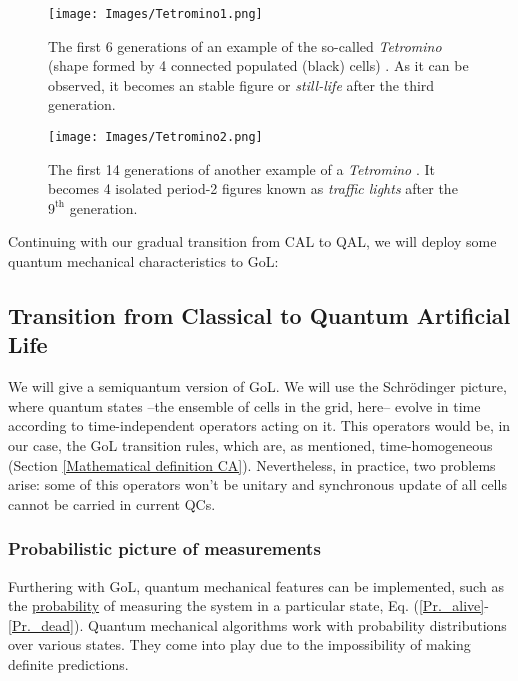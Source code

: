 \documentclass[11pt]{article}
\numberwithin{equation}{section} %
\numberwithin{figure}{section} %
\begin{document}
\begin{figure}[H] 
	\centering
	\texttt{[image: Images/Tetromino1.png]}
	\caption{The first 6 generations of an example of the so-called \emph{Tetromino} (shape formed by 4 connected populated (black) cells) \cite[p.~4, l.~9-10]{Gardner}. As it can be observed, it becomes an stable figure or \emph{still-life} after the third generation.}
	  \label{fig:Tetromino1}
\end{figure}

\begin{figure}[H] 
	\centering
	\texttt{[image: Images/Tetromino2.png]}
	\caption{The first 14 generations of another example of a \emph{Tetromino} \cite[p.~4, l.~10-11]{Gardner}. It becomes 4 isolated period-2 figures known as \emph{traffic lights} after the $9^\textrm{th}$ generation.}
	  \label{fig:Tetromino2}
\end{figure}

\vspace{1cm}
Continuing with our gradual transition from CAL to QAL, we will deploy some quantum mechanical characteristics to GoL:

\subsection{Transition from Classical to Quantum Artificial Life} \label{Semi-quantum_GoL}

We will give a semiquantum version of GoL. We will use the Schrödinger picture, where quantum states --the ensemble of cells in the grid, here-- evolve in time according to time-independent operators acting on it. This operators would be, in our case, the GoL transition rules, which are, as mentioned,  time-homogeneous (Section \ref{Mathematical definition CA}). Nevertheless, in practice, two problems arise: some of this operators won't be unitary and synchronous
update of all cells cannot be carried in current QCs.

\subsubsection{Probabilistic picture of measurements} \label{probabilistic_picture}

Furthering with GoL, quantum mechanical features can be implemented, such as the \uline{probability} of measuring the system in a particular state, Eq. (\ref{Pr._alive}-\ref{Pr._dead}). Quantum mechanical algorithms work with probability distributions over various states. They come into play due to the impossibility of making definite predictions. 
\end{document}
